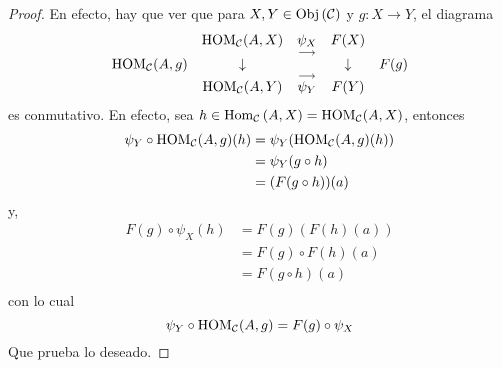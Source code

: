 \documentclass[12pt]{report}
\newcounter{it}
\theoremstyle{largebreak}
\newcommand\cf[3]{\ensuremath{#1:#2\rightarrow#3}}
\newcommand{\Obj}[1]{\ensuremath{\textup{Obj}\left(#1\right)}}
\newcommand{\Hom}[3]{\ensuremath{\textup{Hom}_{#1}\left(#2,#3\right)}}
\begin{document}
\begin{proof}
        En efecto, hay que ver que para $X,Y\in\Obj{\mathcal{C}}$ y $\cf{g}{X}{Y}$, el diagrama
        \begin{equation*}
            \begin{array}{rcccl}
                & \textup{HOM}_{\mathcal{C}}(A,X) & \underset{\longrightarrow}{\psi_{X}} & F(X) &\\
                \textup{HOM}_{\mathcal{C}}(A,g) & \downarrow & & \downarrow & F(g) \\
                & \textup{HOM}_{\mathcal{C}}(A,Y) & \overset{\longrightarrow}{\psi_{Y}} & F(Y) &\\
            \end{array}
        \end{equation*}
        es conmutativo. En efecto, sea $h\in\Hom{\mathcal{C}}{A}{X}=\HOM{\mathcal{C}}(A,X)$, entonces
        \begin{equation*}
            \begin{split}
                \psi_Y\circ \textup{HOM}_{\mathcal{C}}(A,g)(h)&=\psi_Y(\textup{HOM}_{\mathcal{C}}(A,g)(h))\\
                &=\psi_Y(g\circ h)\\
                &=(F(g\circ h))(a)\\
            \end{split}
        \end{equation*}
        y,
        \begin{equation*}
            \begin{split}
                F(g)\circ\psi_X(h)&=F(g)(F(h)(a))\\
                &=F(g)\circ F(h)(a)\\
                &=F(g\circ h)(a)\\
            \end{split}
        \end{equation*}
        con lo cual
        \begin{equation*}
            \psi_Y\circ \textup{HOM}_{\mathcal{C}}(A,g)=F(g)\circ\psi_X
        \end{equation*}
        Que prueba lo deseado.
    \end{proof}
\end{document}
